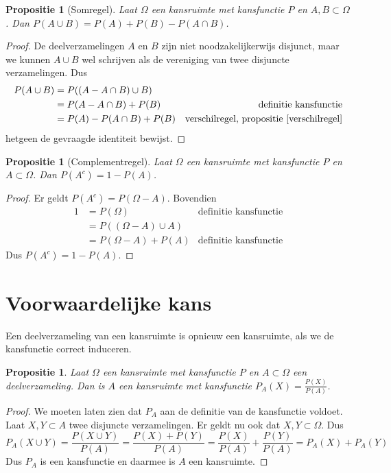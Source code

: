 \documentclass[a4paper]{report}
\newtheorem{proposition}[theorem]{Propositie}
\theoremstyle{definition}
\begin{document}
\begin{proposition}[Somregel]
    \label{somregel}
    Laat $\Omega$ een kansruimte met kansfunctie $P$ en $A,B \subset \Omega$.
    Dan $P(A \cup B) = P(A) + P(B) - P(A \cap B)$.
\end{proposition}
\begin{proof}
    De deelverzamelingen $A$ en $B$ zijn niet noodzakelijkerwijs disjunct, maar we kunnen $A \cup B$ wel schrijven als de vereniging van twee disjuncte verzamelingen.
    Dus 
    \begin{align*}
        P(A \cup B)     &= P( (A - A \cap B) \cup B) \\
                        &= P(A - A \cap B) + P(B)  & \text{definitie kansfunctie}\\
                        &= P(A) - P(A \cap B) + P(B) & \text{verschilregel, propositie~\ref{verschilregel}}
    \end{align*}
    hetgeen de gevraagde identiteit bewijst.
\end{proof}

\begin{proposition}[Complementregel]
    \label{complementregel}
    Laat $\Omega$ een kansruimte met kansfunctie $P$ en $A \subset \Omega$.
    Dan $P(A^c) = 1 - P(A)$.
\end{proposition}
\begin{proof}
    Er geldt $P(A^c) = P(\Omega - A)$.
    Bovendien
    \begin{align*}
        1 &= P(\Omega) & \text{definitie kansfunctie}\\
          &= P( (\Omega - A) \cup A) \\
          &= P(\Omega - A) + P(A) & \text{definitie kansfunctie}
    \end{align*}
    Dus $P(A^c) = 1 - P(A)$.
\end{proof}


\section{Voorwaardelijke kans}

Een deelverzameling van een kansruimte is opnieuw een kansruimte, als we de kansfunctie correct induceren.
\begin{proposition}
    Laat $\Omega$ een kansruimte met kansfunctie $P$ en $A \subset \Omega$ een deelverzameling.
    Dan is $A$ een kansruimte met kansfunctie $P_A(X) = \frac{P(X)}{P(A)}$.
\end{proposition}
\begin{proof}
    We moeten laten zien dat $P_A$ aan de definitie van de kansfunctie voldoet.
    Laat $X,Y \subset A$ twee disjuncte verzamelingen.
    Er geldt nu ook dat $X,Y \subset \Omega$. 
    Dus \[ P_A(X \cup Y) = \frac{P(X \cup Y)}{P(A)} = \frac{P(X) + P(Y)}{P(A)} = \frac{P(X)}{P(A)} + \frac{P(Y)}{P(A)} = P_A(X) + P_A(Y) \]
    Dus $P_A$ is een kansfunctie en daarmee is $A$ een kansruimte.
\end{proof}
\end{document}
